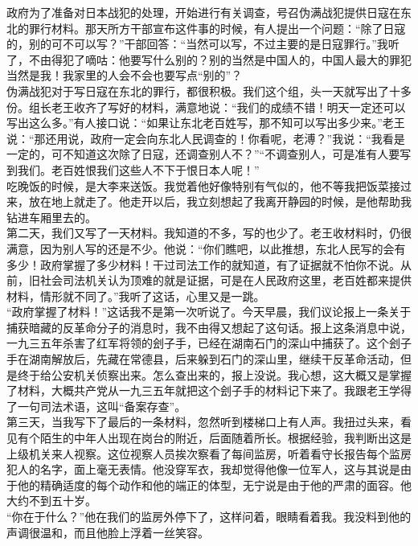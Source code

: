 政府为了准备对日本战犯的处理，开始进行有关调查，号召伪满战犯提供日寇在东北的罪行材料。那天所方干部宣布这件事的时候，有人提出一个问题：“除了日寇的，别的可不可以写？”干部回答：“当然可以写，不过主要的是日寇罪行。”我听了，不由得犯了嘀咕：他要写什么别的？别的当然是中国人的，中国人最大的罪犯当然是我！我家里的人会不会也要写点“别的”？\\

伪满战犯对于写日寇在东北的罪行，都很积极。我们这个组，头一天就写出了十多份。组长老王收齐了写好的材料，满意地说：“我们的成绩不错！明天一定还可以写出这么多。”有人接口说：“如果让东北老百姓写，那不知可以写出多少来。”老王说：“那还用说，政府一定会向东北人民调查的！你看呢，老溥？”我说：“我看是一定的，可不知道这次除了日寇，还调查别人不？”“不调查别人，可是准有人要写到我们。老百姓恨我们这些人不下于恨日本人呢！”\\

吃晚饭的时候，是大李来送饭。我觉着他好像特别有气似的，他不等我把饭菜接过来，放在地上就走了。他走开以后，我立刻想起了我离开静园的时候，是他帮助我钻进车厢里去的。\\

第二天，我们又写了一天材料。我知道的不多，写的也少了。老王收材料时，仍很满意，因为别人写的还是不少。他说：“你们瞧吧，以此推想，东北人民写的会有多少！政府掌握了多少材料！干过司法工作的就知道，有了证据就不怕你不说。从前，旧社会司法机关认为顶难的就是证据，可是在人民政府这里，老百姓都来提供材料，情形就不同了。”我听了这话，心里又是一跳。\\

“政府掌握了材料！”这话我不是第一次听说了。今天早晨，我们议论报上一条关于捕获暗藏的反革命分子的消息时，我不由得又想起了这句话。报上这条消息中说，一九三五年杀害了红军将领的刽子手，已经在湖南石门的深山中捕获了。这个刽子手在湖南解放后，先藏在常德县，后来躲到石门的深山里，继续干反革命活动，但是终于给公安机关侦察出来。怎么查出来的，报上没说。我心想，这大概又是掌握了材料，大概共产党从一九三五年就把这个刽子手的材料记下来了。我跟老王学得了一句司法术语，这叫“备案存查”。\\

第三天，当我写下了最后的一条材料，忽然听到楼梯口上有人声。我扭过头来，看见有个陌生的中年人出现在岗台的附近，后面随着所长。根据经验，我判断出这是上级机关来人视察。这位视察人员挨次察看了每间监房，听着看守长报告每个监房犯人的名字，面上毫无表情。他没穿军衣，我却觉得他像一位军人，这与其说是由于他的精确适度的每个动作和他的端正的体型，无宁说是由于他的严肃的面容。他大约不到五十岁。\\

“你在于什么？”他在我们的监房外停下了，这样问着，眼睛看着我。我没料到他的声调很温和，而且他脸上浮着一丝笑容。\\

